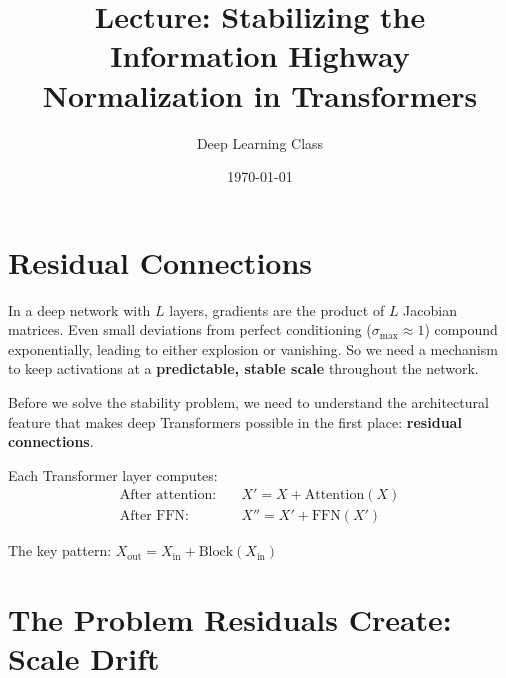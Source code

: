\documentclass{article}
\title{Lecture: Stabilizing the Information Highway\\
Normalization in Transformers}
\author{Deep Learning Class}
\date{\today}
\begin{document}
\maketitle

\section{Residual Connections}

In a deep network with $L$ layers, gradients are the product of $L$ Jacobian matrices. Even small deviations from perfect conditioning ($\sigma_{\max} \approx 1$) compound exponentially, leading to either explosion or vanishing.
So we need a mechanism to keep activations at a \textbf{predictable, stable scale} throughout the network.

Before we solve the stability problem, we need to understand the architectural feature that makes deep Transformers possible in the first place: \textbf{residual connections}.

Each Transformer layer computes:
\begin{align}
\text{After attention:} \quad &X' = X + \text{Attention}(X) \\
\text{After FFN:} \quad &X'' = X' + \text{FFN}(X')
\end{align}

The key pattern: $X_{\text{out}} = X_{\text{in}} + \text{Block}(X_{\text{in}})$

\begin{center}
\end{center}

\section{The Problem Residuals Create: Scale Drift}
\end{document}
